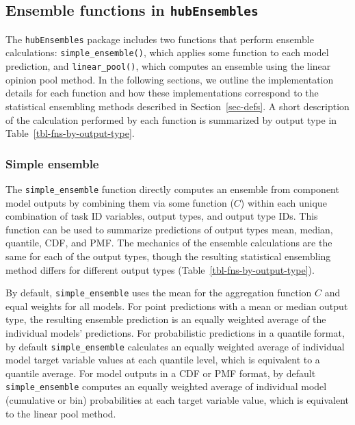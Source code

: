 \documentclass[
]{article}
\begin{document}
\subsection{\texorpdfstring{Ensemble functions in
\texttt{hubEnsembles}}{Ensemble functions in hubEnsembles}}\label{ensemble-functions-in-hubensembles}

The \texttt{hubEnsembles} package includes two functions that perform
ensemble calculations: \texttt{simple\_ensemble()}, which applies some
function to each model prediction, and \texttt{linear\_pool()}, which
computes an ensemble using the linear opinion pool method. In the
following sections, we outline the implementation details for each
function and how these implementations correspond to the statistical
ensembling methods described in Section~\ref{sec-defs}. A short
description of the calculation performed by each function is summarized
by output type in Table~\ref{tbl-fns-by-output-type}.

\subsubsection{Simple ensemble}\label{simple-ensemble}

The \texttt{simple\_ensemble} function directly computes an ensemble
from component model outputs by combining them via some function (\(C\))
within each unique combination of task ID variables, output types, and
output type IDs. This function can be used to summarize predictions of
output types mean, median, quantile, CDF, and PMF. The mechanics of the
ensemble calculations are the same for each of the output types, though
the resulting statistical ensembling method differs for different output
types (Table~\ref{tbl-fns-by-output-type}).

By default, \texttt{simple\_ensemble} uses the mean for the aggregation
function \(C\) and equal weights for all models. For point predictions
with a mean or median output type, the resulting ensemble prediction is
an equally weighted average of the individual models' predictions. For
probabilistic predictions in a quantile format, by default
\texttt{simple\_ensemble} calculates an equally weighted average of
individual model target variable values at each quantile level, which is
equivalent to a quantile average. For model outputs in a CDF or PMF
format, by default \texttt{simple\_ensemble} computes an equally
weighted average of individual model (cumulative or bin) probabilities
at each target variable value, which is equivalent to the linear pool
method.
\end{document}
